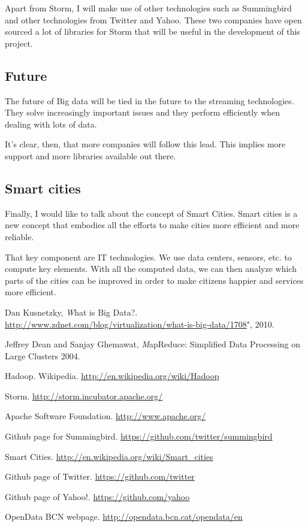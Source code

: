 Apart from Storm, I will make use of other technologies such as
Summingbird\cite{summingbird} and other technologies from Twitter\cite{twitter}
and Yahoo\cite{yahoo}. These two companies have open sourced a lot of libraries
for Storm that will be useful in the development of this project.

\subsection{Future}

The future of Big data will be tied in the future to the streaming
technologies. They solve increasingly important issues and they perform efficiently
when dealing with lots of data.

It's clear, then, that more companies will follow this lead. This implies more
support and more libraries available out there.

\subsection{Smart cities}

Finally, I would like to talk about the concept of Smart Cities\cite{smart}.
Smart cities is a new concept that embodies all the efforts to make cities more
efficient and more reliable.

That key component are IT technologies. We use data centers, sensors, etc. to
compute key elements. With all the computed data, we can then analyze which
parts of the cities can be improved in order to make citizens happier and
services more efficient.

\newpage

\renewcommand\refname{Bibliography}
\begin{thebibliography}{9}

  Dan Kusnetzky,
  {\emph What is Big Data?}.
  \url{http://www.zdnet.com/blog/virtualization/what-is-big-data/1708}",
  2010.

  Jeffrey Dean and Sanjay Ghemawat,
  {\emph MapReduce: Simplified Data Processing on Large Clusters}
  2004.

  Hadoop. Wikipedia.
  \url{http://en.wikipedia.org/wiki/Hadoop}

  Storm.
  \url{http://storm.incubator.apache.org/}

  Apache Software Foundation.
  \url{http://www.apache.org/}

  Github page for Summingbird.
  \url{https://github.com/twitter/summingbird}

  Smart Cities.
  \url{http://en.wikipedia.org/wiki/Smart_cities}

  Github page of Twitter.
  \url{https://github.com/twitter}

  Github page of Yahoo!.
  \url{https://github.com/yahoo}

  OpenData BCN webpage.
  \url{http://opendata.bcn.cat/opendata/en}

\end{thebibliography}
